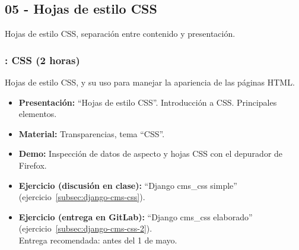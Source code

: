 \documentclass[a4paper,12pt]{article}
\begin{document}
%
%
%
%
\subsection{05 - Hojas de estilo CSS}

Hojas de estilo CSS, separación entre contenido y presentación.

\subsubsection{\juevesN: CSS (2 horas)}
\label{cal:juevesN}

Hojas de estilo CSS, y su uso para manejar la apariencia de las páginas HTML.

\begin{itemize}
\item \textbf{Presentación:} ``Hojas de estilo CSS''. Introducción a CSS. Principales elementos.
 \item \textbf{Material:} Transparencias, tema ``CSS''.
\item \textbf{Demo:} Inspección de datos de aspecto y hojas CSS con el depurador de Firefox.
\item \textbf{Ejercicio (discusión en clase):} ``Django cms\_css simple'' (ejercicio~\ref{subsec:django-cms-css}).
\item \textbf{Ejercicio (entrega en GitLab):} ``Django cms\_css elaborado'' (ejercicio~\ref{subsec:django-cms-css-2}). \\
  Entrega recomendada: antes del 1 de mayo.
\end{itemize}
\end{document}
